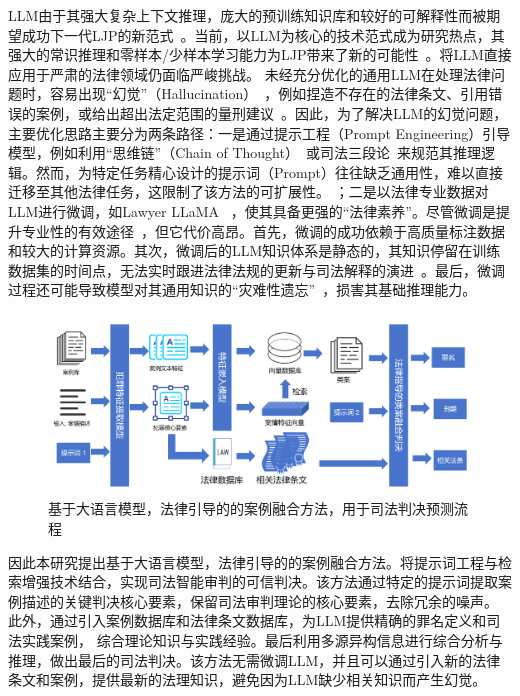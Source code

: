 LLM由于其强大复杂上下文推理，庞大的预训练知识库和较好的可解释性而被期望成功下一代LJP的新范式~\cite{wu2020de-biased,yang2023baichuan,yao2020refining}。当前，以LLM为核心的技术范式成为研究热点，其强大的常识推理和零样本/少样本学习能力为LJP带来了新的可能性~\cite{brown2020language,huang2022towards,shu2024large,wen2024review}。将LLM直接应用于严肃的法律领域仍面临严峻挑战。
未经充分优化的通用LLM在处理法律问题时，容易出现“幻觉”（Hallucination）~\cite{cui2023survey,radford2025improving,raffel2020exploring}，例如捏造不存在的法律条文、引用错误的案例，或给出超出法定范围的量刑建议~\cite{lewis2020retrieval}。因此，为了解决LLM的幻觉问题，主要优化思路主要分为两条路径：一是通过提示工程（Prompt Engineering）引导模型，例如利用“思维链”（Chain of Thought）~\cite{kojima2022large,izacard2021leveraging,rajani2019explain,talmor2019leap,wang2023self,wei2022chain}或司法三段论~\cite{huang2023lawyer,trautmann2022legal,xu2023superclue,yu2022legal}来规范其推理逻辑。然而，为特定任务精心设计的提示词（Prompt）往往缺乏通用性，难以直接迁移至其他法律任务，这限制了该方法的可扩展性。
；二是以法律专业数据对LLM进行微调，如Lawyer LLaMA ~\cite{chen2020recall,yue2021circumstances}，使其具备更强的“法律素养”。尽管微调是提升专业性的有效途径~\cite{hu2021lora,hu2022lora,zelikman2024star}，但它代价高昂。首先，微调的成功依赖于高质量标注数据和较大的计算资源。其次，微调后的LLM知识体系是静态的，其知识停留在训练数据集的时间点，无法实时跟进法律法规的更新与司法解释的演进~\cite{li2021prefix,zhang2024comprehensive}。最后，微调过程还可能导致模型对其通用知识的“灾难性遗忘”~\cite{chen2020recall}，损害其基础推理能力。
\begin{figure}[htpb]
	\centering
	\includegraphics[width=1\textwidth]{fig/method.pdf}
	\caption{基于大语言模型，法律引导的的案例融合方法，用于司法判决预测流程}
	\label{fig:main}
\end{figure}
因此本研究提出基于大语言模型，法律引导的的案例融合方法。将提示词工程与检索增强技术结合，实现司法智能审判的可信判决。该方法通过特定的提示词提取案例描述的关键判决核心要素，保留司法审判理论的核心要素，去除冗余的噪声。 此外，通过引入案例数据库和法律条文数据库，为LLM提供精确的罪名定义和司法实践案例， 综合理论知识与实践经验。最后利用多源异构信息进行综合分析与推理，做出最后的司法判决。该方法无需微调LLM，并且可以通过引入新的法律条文和案例，提供最新的法理知识，避免因为LLM缺少相关知识而产生幻觉。
